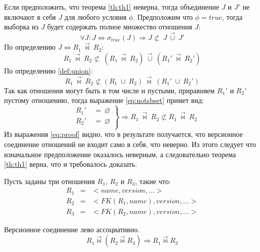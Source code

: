 \indent Если предположить, что теорема \ref{th:th1} неверна, тогда объединение $J$ и $J'$ не включают в себя $J$ для любого условия $\phi$.
Предположим что $\phi = true$, тогда выборка из $J$ будет содержать полное множество отношения $J$:
\begin{equation*}
	\label{eq:firstProof}
	\forall J: J \Leftrightarrow \sigma_{true}(J) \Rightarrow J \not\subset\ J\ \overrightarrow{\cup}\ J'
\end{equation*}
\indent По определению $J \Leftrightarrow R_1\ \overrightarrow{\bowtie}\ R_2$:
\begin{equation}
	R_1\ \overrightarrow{\bowtie}\ R_2 \not\subset\ (R_1\ \overrightarrow{\bowtie}\ R_2)\ \overrightarrow{\cup}\ (R_1'\ \overrightarrow{\bowtie}\ R_2')
\end{equation}
\indent По определению \ref{def:union}:
\begin{equation}
	\label{eq:notsbset}
	R_1\ \overrightarrow{\bowtie}\ R_2 \not\subset (R_1\ \cup\ R_2)\ \overrightarrow{\bowtie}\ (R_1'\ \cup\ R_2')
\end{equation}
\indent Так как отношения могут быть в том числе и пустыми, приравняем $R_1'$ и $R_2'$ пустому отношению, тогда выражение \ref{eq:notsbset} примет вид:
\begin{equation}
	\label{eq:proof}
	\left.
		\begin{array}{ccc}
			&R_1'\ & =\ \varnothing \\
			&R_2'\ & =\ \varnothing \\
		\end{array}
	\right\} \Rightarrow
	R_1\ \overrightarrow{\bowtie}\ R_2 \not\subset R_1\ \overrightarrow{\bowtie}\ R_2
\end{equation}
\indent Из выражения \ref{eq:proof} видно, что в результате получается, что версионное соединение отношений не входит само в себя, что неверно.
Из этого следует что изначальное предположение оказалось неверным, а следовательно теорема \ref{th:th1} верна, что и требовалось доказать.

\indent Пусть заданы три отношения $R_1$, $R_2$ и $R_3$, такие что:
\begin{eqnarray*}
	R_1 & = & <name, version, ...> \\
	R_2 & = & <FK(R_1, name), version, ...>\\
	R_3 & = & <FK(R_2, name), version, ...>
\end{eqnarray*}
\begin{theorem}
	\label{th:assoc}
	Версионное соединение лево ассоциативно.
	\begin{equation}
		R_1 \overrightarrow{\bowtie} (R_2 \overrightarrow{\bowtie} R_3) \Rightarrow R_1 \overrightarrow{\bowtie} R_3
	\end{equation}
\end{theorem}


